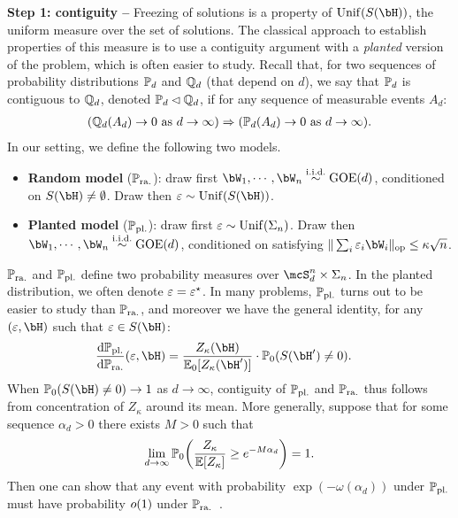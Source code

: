 \myskip 
\textbf{Step 1: contiguity --}
Freezing of solutions is a property of $\Unif(S(\bH))$, the uniform measure over the set of solutions.
The classical approach to establish properties of this measure is to use a contiguity argument with a \emph{planted} version of the problem, 
which is often easier to study.
Recall that, for two sequences of probability distributions $\mathbb{P}_d$ and $\mathbb{Q}_d$ (that depend on $d$), we say that $\mathbb{P}_d$ is contiguous to $\mathbb{Q}_d$, denoted $\mathbb{P}_d \lhd \mathbb{Q}_d$, 
if for any sequence of measurable events $A_d$:
\begin{align}\label{eq:contiguity}
(\mathbb{Q}_d(A_d) \to 0 \textrm{ as } d \to \infty)
 \Rightarrow 
(\mathbb{P}_d(A_d) \to 0 \textrm{ as } d \to \infty).
\end{align}
In our setting, we define the following two models.
\begin{itemize}[leftmargin=*]
    \item \textbf{Random model} ($\mathbb{P}_{\mathrm{ra.}}$): draw first $\bW_1, \cdots, \bW_n \iid \GOE(d)$, conditioned on $S(\bH) \neq \emptyset$.
    Draw then $\eps \sim \Unif(S(\bH))$.
    \item \textbf{Planted model} ($\mathbb{P}_{\mathrm{pl.}}$): draw first $\varepsilon \sim \mathrm{Unif}(\Sigma_n)$. Draw then $\bW_1, \cdots, \bW_n \iid \GOE(d)$, conditioned on 
    satisfying $\|\sum_i \eps_i \bW_i\|_\op \leq \kappa \sqrt{n}$.
\end{itemize}
$\mathbb{P}_{\mathrm{ra.}}$ and $\mathbb{P}_{\mathrm{pl.}}$ define two probability measures over $\mcS_d^n \times \Sigma_n$. In the planted distribution, 
we often denote $\varepsilon = \varepsilon^\star$.
In many problems, $\mathbb{P}_{\mathrm{pl.}}$ turns out to be easier to study than $\mathbb{P}_{\mathrm{ra.}}$, and moreover we have the general identity, 
for any $(\eps, \bH)$ such that $\eps \in S(\bH)$:
\begin{align}\label{eq:planted_random}
    \frac{\rd \bbP_{\pl}}{\rd \bbP_{\ra}}(\eps, \bH) &= \frac{Z_\kappa(\bH)}{\EE_0[Z_\kappa(\bH')]} \cdot \bbP_0(S(\bH') \neq 0).
\end{align}
When $\bbP_0(S(\bH) \neq 0) \to 1$ as $d \to \infty$, contiguity of $\mathbb{P}_{\mathrm{pl.}}$ and $\mathbb{P}_{\mathrm{ra.}}$ thus follows from concentration of $Z_\kappa$ around its mean. 
More generally, suppose that for some sequence $\alpha_d > 0$ there exists $M > 0$ such that
\begin{align}\label{eq:concentration_fenergy}
    \lim_{d \to \infty}\mathbb{P}_0\!\left(\frac{Z_\kappa}{\mathbb{E}[Z_\kappa]} \geq e^{-M\alpha_d}\right) = 1.
\end{align}
Then one can show that any event with probability $\exp(-\omega(\alpha_d))$ under $\mathbb{P}_{\mathrm{pl.}}$ must have probability $o(1)$ under $\mathbb{P}_{\mathrm{ra.}}$~\citep{perkins2021frozen}.
